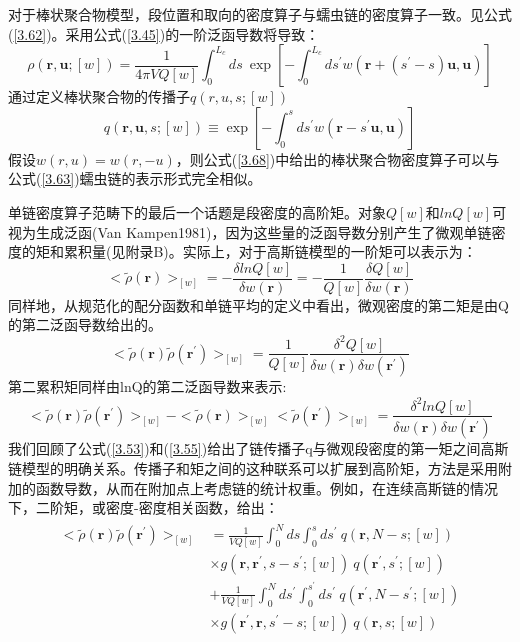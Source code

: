 对于棒状聚合物模型，段位置和取向的密度算子与蠕虫链的密度算子一致。见公式(\ref{3.62})。采用公式(\ref{3.45})的一阶泛函导数将导致：
\begin{equation}\label{3.68}
\rho(\mathbf{r},\mathbf{u};[w])=\frac{1}{4\pi VQ[w]}\int_{0}^{L_c}ds~\exp[-\int_{0}^{L_c}ds^{'}w (\mathbf{r}+(s^{'}-s)\mathbf{u},\mathbf{u})]
\end{equation}
通过定义棒状聚合物的传播子$q(r,u,s;[w])$
\begin{equation}\label{3.69}
q(\mathbf{r},\mathbf{u},s;[w])\equiv \exp[-\int_{0}^{s}ds^{'}w(\mathbf{r}-s^{'}\mathbf{u},\mathbf{u})]
\end{equation}
假设$w(r,u)=w(r,-u)$，则公式(\ref{3.68})中给出的棒状聚合物密度算子可以与公式(\ref{3.63})蠕虫链的表示形式完全相似。

单链密度算子范畴下的最后一个话题是段密度的高阶矩。对象$Q[w]$和$ln Q[w]$可视为生成泛函(Van Kampen1981)，因为这些量的泛函导数分别产生了微观单链密度的矩和累积量(见附录B)。实际上，对于高斯链模型的一阶矩可以表示为：
\begin{equation}\label{3.70}
<\tilde{\rho}(\mathbf{r})>_{[w]}=-\frac{\delta lnQ[w]}{\delta w(\mathbf{r})}=-\frac{1}{Q[w]}\frac{\delta Q[w]}{\delta w(\mathbf{r})}
\end{equation}
同样地，从规范化的配分函数和单链平均的定义中看出，微观密度的第二矩是由Q的第二泛函导数给出的。
\begin{equation}\label{3.71}
<\tilde{\rho}(\mathbf{r})\tilde{\rho}(\mathbf{r}^{'})>_{[w]}=\frac{1}{Q[w]}\frac{\delta^2 Q[w]}{\delta w(\mathbf{r})\delta  w(\mathbf{r}^{'})}
\end{equation}
第二累积矩同样由lnQ的第二泛函导数来表示:
\begin{equation}\label{3.72}
<\tilde{\rho}(\mathbf{r})\tilde{\rho}(\mathbf{r}^{'})>_{[w]}-<\tilde{\rho}(\mathbf{r})>_{[w]}<\tilde{\rho}(\mathbf{r}^{'})>_{[w]}=\frac{\delta^2 lnQ[w]}{\delta w(\mathbf{r})\delta w(\mathbf{r}^{'})}
\end{equation}
我们回顾了公式(\ref{3.53})和(\ref{3.55})给出了链传播子q与微观段密度的第一矩之间高斯链模型的明确关系。传播子和矩之间的这种联系可以扩展到高阶矩，方法是采用附加的函数导数，从而在附加点上考虑链的统计权重。例如，在连续高斯链的情况下，二阶矩，或密度-密度相关函数，给出：
\begin{align}\label{3.73}
\begin{split}
<\tilde{\rho}(\mathbf{r})\tilde{\rho}(\mathbf{r}^{'})>_{[w]}&=\frac{1}{VQ[w]}\int_{0}^{N}ds \int_{0}^{s}ds^{'}~q(\mathbf{r},N-s;[w])\\&\times g(\mathbf{r},\mathbf{r}^{'},s-s^{'};[w])~q(\mathbf{r}^{'},s^{'};[w])\\&+\frac{1}{VQ[w]}\int_{0}^{N}ds^{'} \int_{0}^{s^{'}}ds^{'}~q(\mathbf{r}^{'},N-s^{'};[w])\\&\times g(\mathbf{r}^{'},\mathbf{r},s^{'}-s;[w])~q(\mathbf{r},s;[w])
\end{split}
\end{align}
